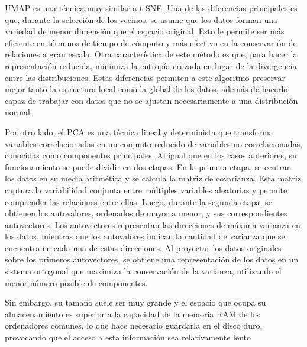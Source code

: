 UMAP es una técnica muy similar a t-SNE. Una de las diferencias principales es que, durante la selección de los vecinos, se asume que los datos forman una variedad de menor dimensión que el espacio original. Esto le permite ser más eficiente en términos de tiempo de cómputo y más efectivo en la conservación de relaciones a gran escala. Otra característica de este método es que, para hacer la representación reducida, minimiza la entropía cruzada en lugar de la divergencia entre las distribuciones. Estas diferencias permiten a este algoritmo preservar mejor tanto la estructura local como la global de los datos, además de hacerlo capaz de trabajar con datos que no se ajustan necesariamente a una distribución normal. 

Por otro lado, el PCA es una técnica lineal y determinista que transforma variables correlacionadas en un conjunto reducido de variables no correlacionadas, conocidas como componentes principales. Al igual que en los casos anteriores, su funcionamiento se puede dividir en dos etapas. En la primera etapa, se centran los datos en su media aritmética y se calcula la matriz de covarianza. Esta matriz captura la variabilidad conjunta entre múltiples variables aleatorias y permite comprender las relaciones entre ellas. Luego, durante la segunda etapa, se obtienen los autovalores, ordenados de mayor a menor, y sus correspondientes autovectores. Los autovectores representan las direcciones de máxima varianza en los datos, mientras que los autovalores indican la cantidad de varianza que se encuentra en cada una de estas direcciones. Al proyectar los datos originales sobre los primeros autovectores, se obtiene una representación de los datos en un sistema ortogonal que maximiza la conservación de la varianza, utilizando el menor número posible de componentes.


Sin embargo, su tamaño suele ser muy grande y el espacio que ocupa su almacenamiento es superior a la capacidad de la memoria RAM de los ordenadores comunes, lo que hace necesario guardarla en el disco duro, provocando que el acceso a esta información sea relativamente lento 


